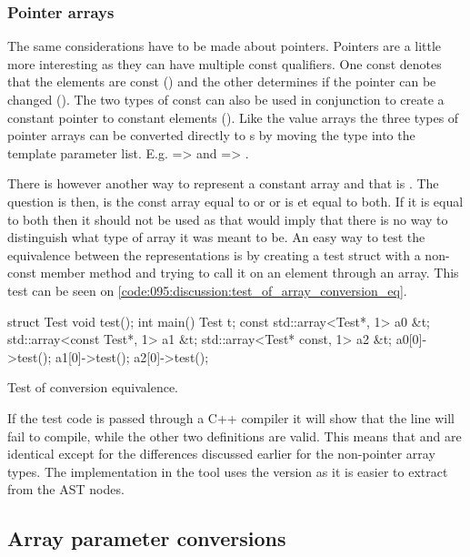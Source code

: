 \subsubsection*{Pointer arrays}

The same considerations have to be made about pointers. Pointers are a little more interesting as they can have multiple const qualifiers. One const denotes that the elements are const () and the other determines if the pointer can be changed (). The two types of const can also be used in conjunction to create a constant pointer to constant elements (). Like the value arrays the three types of pointer arrays can be converted directly to s by moving the type into the template parameter list. E.g.  =>  and  => .

There is however another way to represent a constant array and that is . The question is then, is the const array equal to  or  or is et equal to both. If it is equal to both then it should not be used as that would imply that there is no way to distinguish what type of array it was meant to be. An easy way to test the equivalence between the representations is by creating a test struct with a non-const member method and trying to call it on an element through an array. This test can be seen on \cref{code:095:discussion:test_of_array_conversion_eq}.

\begin{listing}[H]
    \begin{cppcode}
struct Test {void test(){}};
int main() {
    Test t;
    const std::array<Test*, 1> a0 {&t};
    std::array<const Test*, 1> a1 {&t};
    std::array<Test* const, 1> a2 {&t};
    a0[0]->test();
    a1[0]->test();
    a2[0]->test();
}
    \end{cppcode}
    \caption{Test of conversion equivalence.}
    \label{code:095:discussion:test_of_array_conversion_eq}
\end{listing}

If the test code is passed through a C++ compiler it will show that the  line will fail to compile, while the other two definitions are valid. This means that  and  are identical except for the differences discussed earlier for the non-pointer array types. The implementation in the tool uses the  version as it is easier to extract from the AST nodes.

\subsection{Array parameter conversions}

